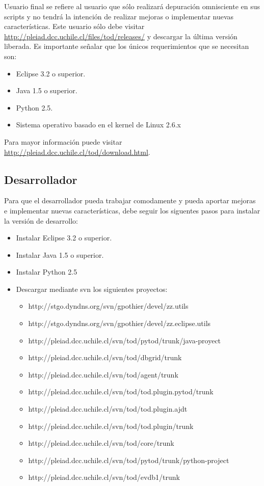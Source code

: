 \documentclass[12pt,legalpaper]{report}
\begin{document}
Usuario final se refiere al usuario que sólo realizará depuración omnisciente en sus scripts y no tendrá la intención de realizar mejoras o implementar nuevas características.  Este usuario sólo debe visitar \href{http://pleiad.dcc.uchile.cl/files/tod/releases/}{http://pleiad.dcc.uchile.cl/files/tod/releases/} y descargar la última versión liberada.  Es importante señalar que los únicos requerimientos que se necesitan son:
\begin{itemize}
	\item Eclipse 3.2 o superior.
	\item Java 1.5 o superior.
	\item Python 2.5.
	 \item Sistema operativo basado en el kernel de Linux 2.6.x
\end{itemize}	

Para mayor información puede visitar \href{http://pleiad.dcc.uchile.cl/tod/download.html}{http://pleiad.dcc.uchile.cl/tod/download.html}.
		
		\subsection{Desarrollador}
		
Para que el desarrollador pueda trabajar comodamente y pueda aportar mejoras e implementar nuevas características, debe seguir los siguentes pasos para instalar la versión de desarrollo:

\begin{itemize}
	\item Instalar Eclipse 3.2 o superior.
	\item Instalar Java 1.5 o superior.
	\item Instalar Python 2.5
	 \item Descargar mediante svn los siguientes proyectos:
	 \begin{itemize}
		\item http://stgo.dyndns.org/svn/gpothier/devel/zz.utils
		\item http://stgo.dyndns.org/svn/gpothier/devel/zz.eclipse.utils
		\item http://pleiad.dcc.uchile.cl/svn/tod/pytod/trunk/java-proyect
		\item http://pleiad.dcc.uchile.cl/svn/tod/dbgrid/trunk
		\item http://pleiad.dcc.uchile.cl/svn/tod/agent/trunk
		\item http://pleiad.dcc.uchile.cl/svn/tod/tod.plugin.pytod/trunk
		\item http://pleiad.dcc.uchile.cl/svn/tod/tod.plugin.ajdt
		\item http://pleiad.dcc.uchile.cl/svn/tod/tod.plugin/trunk
		\item http://pleiad.dcc.uchile.cl/svn/tod/core/trunk
		\item http://pleiad.dcc.uchile.cl/svn/tod/pytod/trunk/python-project
		\item http://pleiad.dcc.uchile.cl/svn/tod/evdb1/trunk
	 \end{itemize}
\end{itemize}
\end{document}
